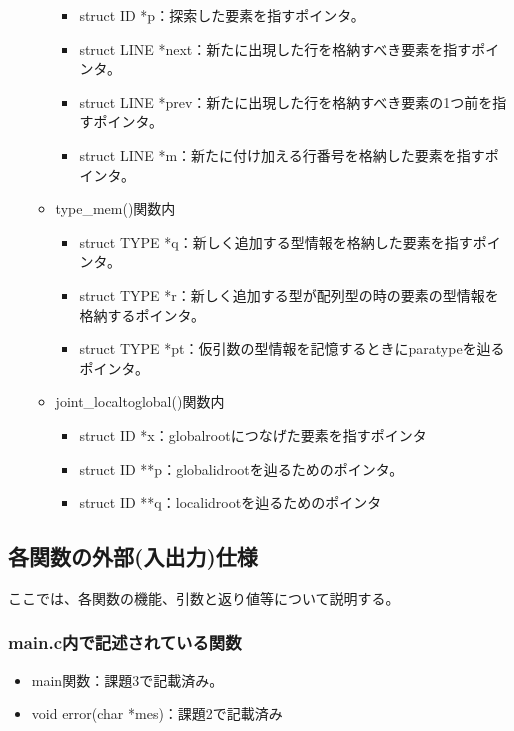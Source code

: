 \documentclass{jarticle}
\begin{document}
\begin{itemize}
\begin{itemize}
    \begin{itemize}
      \item struct ID *p：探索した要素を指すポインタ。
      \item struct LINE *next：新たに出現した行を格納すべき要素を指すポインタ。
      \item struct LINE *prev：新たに出現した行を格納すべき要素の1つ前を指すポインタ。
      \item struct LINE *m：新たに付け加える行番号を格納した要素を指すポインタ。
    \end{itemize}
    \item type\_mem()関数内
    \begin{itemize}
      \item struct TYPE *q：新しく追加する型情報を格納した要素を指すポインタ。
      \item struct TYPE *r：新しく追加する型が配列型の時の要素の型情報を格納するポインタ。
      \item struct TYPE *pt：仮引数の型情報を記憶するときにparatypeを辿るポインタ。
    \end{itemize}
    \item joint\_localtoglobal()関数内
    \begin{itemize}
      \item struct ID *x：globalrootにつなげた要素を指すポインタ
      \item struct ID **p：globalidrootを辿るためのポインタ。
      \item struct ID **q：localidrootを辿るためのポインタ
    \end{itemize}
  \end{itemize}
\end{itemize}
\subsection{各関数の外部(入出力)仕様}
ここでは、各関数の機能、引数と返り値等について説明する。
\subsubsection{main.c内で記述されている関数}
\begin{itemize}
  \item main関数：課題3で記載済み。
\item void error(char *mes)：課題2で記載済み
\end{itemize}
\end{document}
